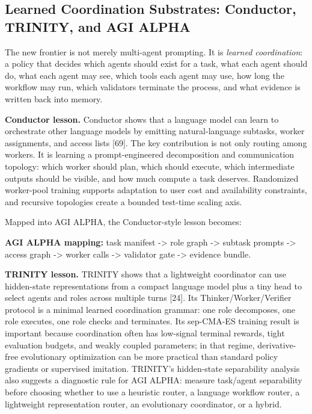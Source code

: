 \documentclass[11pt]{article}
\begin{document}
\subsection{Learned Coordination Substrates: Conductor, TRINITY, and AGI ALPHA}\label{learned-coordination-substrates-conductor-trinity-and-agi-alpha}

The new frontier is not merely multi-agent prompting. It is \emph{learned coordination}: a policy that decides which agents should exist for a task, what each agent should do, what each agent may see, which tools each agent may use, how long the workflow may run, which validators terminate the process, and what evidence is written back into memory.

\textbf{Conductor lesson.} Conductor shows that a language model can learn to orchestrate other language models by emitting natural-language subtasks, worker assignments, and access lists {[}69{]}. The key contribution is not only routing among workers. It is learning a prompt-engineered decomposition and communication topology: which worker should plan, which should execute, which intermediate outputs should be visible, and how much compute a task deserves. Randomized worker-pool training supports adaptation to user cost and availability constraints, and recursive topologies create a bounded test-time scaling axis.

Mapped into AGI ALPHA, the Conductor-style lesson becomes:

\textbf{AGI ALPHA mapping:} task manifest -\textgreater{} role graph -\textgreater{} subtask prompts -\textgreater{} access graph -\textgreater{} worker calls -\textgreater{} validator gate -\textgreater{} evidence bundle.

\textbf{TRINITY lesson.} TRINITY shows that a lightweight coordinator can use hidden-state representations from a compact language model plus a tiny head to select agents and roles across multiple turns {[}24{]}. Its Thinker/Worker/Verifier protocol is a minimal learned coordination grammar: one role decomposes, one role executes, one role checks and terminates. Its sep-CMA-ES training result is important because coordination often has low-signal terminal rewards, tight evaluation budgets, and weakly coupled parameters; in that regime, derivative-free evolutionary optimization can be more practical than standard policy gradients or supervised imitation. TRINITY's hidden-state separability analysis also suggests a diagnostic rule for AGI ALPHA: measure task/agent separability before choosing whether to use a heuristic router, a language workflow router, a lightweight representation router, an evolutionary coordinator, or a hybrid.
\end{document}
